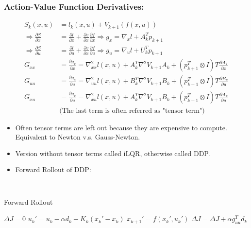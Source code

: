\subsubsection{Action-Value Function Derivatives:}
\begin{align}
    S_k(x,u) & = l_k(x,u) + V_{k+1}(f(x,u)) \\
    \Rightarrow \frac{\partial S}{\partial x} & = \frac{\partial l}{\partial x} + \frac{\partial v}{\partial x} \frac{\partial f}{\partial x} \Rightarrow g_x = \nabla_x l + A_k^T p_{k+1} \\
    \Rightarrow \frac{\partial S}{\partial u} & = \frac{\partial l}{\partial u} + \frac{\partial v}{\partial x} \frac{\partial f}{\partial u} \Rightarrow g_u = \nabla_u l + U_k^T p_{k+1} \\
    G_{xx} & = \frac{\partial g_x}{\partial x} = \nabla_{xx}^2 l(x,u) + A_k^T \nabla^2 V_{k+1} A_k + (p_{k+1}^T \otimes I) T \frac{\partial A_k}{\partial x} \\
    G_{uu} & = \frac{\partial g_u}{\partial u} = \nabla_{uu}^2 l(x,u) + B_k^T \nabla^2 V_{k+1} B_k + (p_{k+1}^T \otimes I) T \frac{\partial B_k}{\partial u} \\
    G_{xu} & = \frac{\partial g_x}{\partial u} = \nabla_{xu}^2 l(x,u) + A_k^T \nabla^2 V_{k+1} B_k + (p_{k+1}^T \otimes I) T \frac{\partial A_k}{\partial u} \\
    & \text{(The last term is often referred as "tensor term")}
\end{align}

\begin{itemize}
    \item Often tensor terms are left out because they are expensive to compute. Equivalent to Newton v.s. Gauss-Newton.
    \item Version without tensor terms called iLQR, otherwise called DDP.
    \item Forward Rollout of DDP:
\end{itemize}

\\
\noindent
\begin{algorithm}
	\caption{Forward Rollout}
	\label{alg:ForwardRollout}
	\begin{algorithmic}[1]	
        \State $\Delta J = 0$
            \State $u_k' = u_k - \alpha d_k - K_k(x_k' - x_k)$ 
            \State $x_{k+1}' = f(x_k', u_k') $
            \State $\Delta J = \Delta J + \alpha g_{uu}^T d_k$ 
        \Endwhile
	\end{algorithmic}
\end{algorithm}
\\


